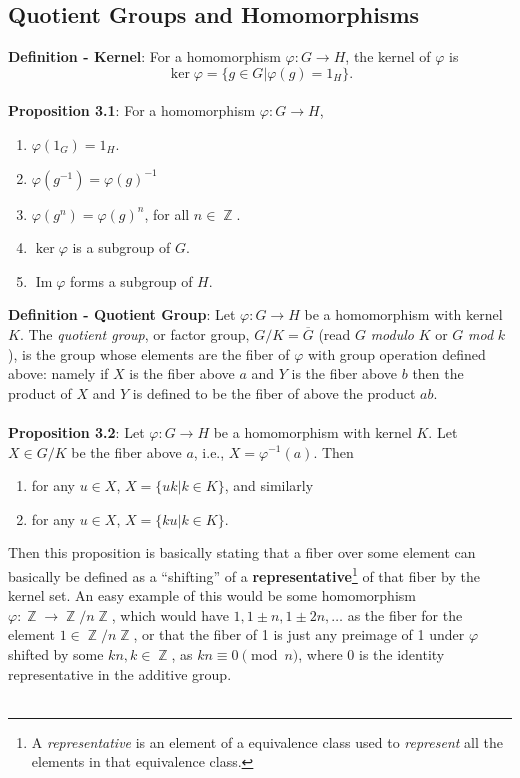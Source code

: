 \documentclass{article}
\DeclareMathOperator{\Z}{\mathbb{Z}}
\DeclareMathOperator{\im}{Im}
\begin{document}
\subsection*{Quotient Groups and Homomorphisms}
\textbf{Definition - Kernel}: For a homomorphism $\varphi: G \rightarrow H$, the kernel of $\varphi$ is $$\ker{\varphi} = \{g \in G| \varphi(g) = 1_H\}.$$ \\
\textbf{Proposition 3.1}: For a homomorphism $\varphi: G \rightarrow H$, \begin{enumerate}
    \item $\varphi(1_G) = 1_H$.
    \item $\varphi(g^{-1}) = \varphi(g)^{-1}$
    \item $\varphi(g^{n}) = \varphi(g)^{n}$, for all $n \in \Z$.
    \item $\ker{\varphi}$ is a subgroup of $G$.
    \item $\im{\varphi}$ forms a subgroup of $H$.
\end{enumerate} $ $ \\
\textbf{Definition - Quotient Group}: Let $\varphi: G \rightarrow H$ be a homomorphism with kernel $K$. The \textit{quotient group}, or factor group, $G/K = \overline{G}$ (read $G$ \textit{modulo} $K$ or $G$ \textit{mod} $k$), is the group whose elements are the fiber of $\varphi$ with group operation defined above: namely if $X$ is the fiber above $a$ and $Y$ is the fiber above $b$ then the product of $X$ and $Y$ is defined to be the fiber of above the product $ab$. \\ \\
\textbf{Proposition 3.2}: Let $\varphi: G \rightarrow H$ be a homomorphism with kernel $K$. Let $X \in G/K$ be the fiber above $a$, i.e., $X = \varphi^{-1}(a)$. Then \begin{enumerate}
    \item for any $u \in X$, $X = \{uk| k \in K\}$, and similarly
    \item for any $u \in X$, $X = \{ku| k \in K\}$.
\end{enumerate}
Then this proposition is basically stating that a fiber over some element can basically be defined as a ``shifting'' of a \textbf{representative}\footnote{A \textit{representative} is an element of a equivalence class used to \textit{represent} all the elements in that equivalence class.} of that fiber by the kernel set. An easy example of this would be some homomorphism $\varphi: \Z \rightarrow \Z/n\Z$, which would have $1, 1 \pm n, 1 \pm 2n, \dots$ as the fiber for the element $1 \in \Z/n\Z$, or that the fiber of 1 is just any preimage of 1 under $\varphi$ shifted by some $kn, k \in \Z$, as $kn \equiv 0 \pmod{n}$, where 0 is the identity representative in the additive group. \\ \\
\end{document}
